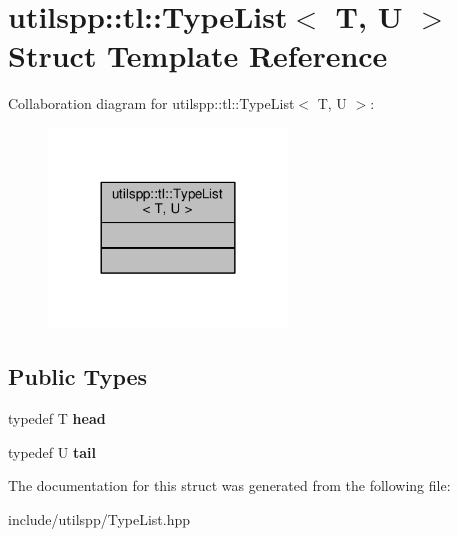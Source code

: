 \hypertarget{structutilspp_1_1tl_1_1TypeList}{\section{utilspp\-:\-:tl\-:\-:Type\-List$<$ T, U $>$ Struct Template Reference}
\label{structutilspp_1_1tl_1_1TypeList}
}


Collaboration diagram for utilspp\-:\-:tl\-:\-:Type\-List$<$ T, U $>$\-:\nopagebreak
\begin{figure}[H]
\begin{center}
\leavevmode
\includegraphics[width=180pt]{structutilspp_1_1tl_1_1TypeList__coll__graph}
\end{center}
\end{figure}
\subsection*{Public Types}
\begin{DoxyCompactItemize}
\item 
\hypertarget{structutilspp_1_1tl_1_1TypeList_a832dc54bcef2339256b054a0b32cc28b}{typedef T {\bfseries head}}\label{structutilspp_1_1tl_1_1TypeList_a832dc54bcef2339256b054a0b32cc28b}

\item 
\hypertarget{structutilspp_1_1tl_1_1TypeList_ac53a6b2ccb7778c278be77ad81592cab}{typedef U {\bfseries tail}}\label{structutilspp_1_1tl_1_1TypeList_ac53a6b2ccb7778c278be77ad81592cab}

\end{DoxyCompactItemize}


The documentation for this struct was generated from the following file\-:\begin{DoxyCompactItemize}
\item 
include/utilspp/Type\-List.\-hpp\end{DoxyCompactItemize}
